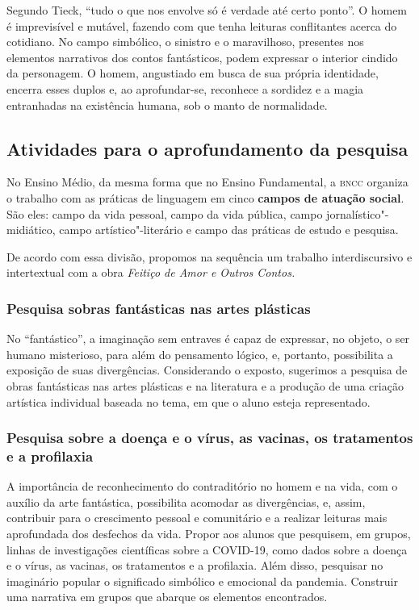 \documentclass[12pt]{extarticle}
\begin{document}
Segundo Tieck, ``tudo o que nos envolve só é verdade até certo ponto''.
O homem é imprevisível e mutável, fazendo com que tenha leituras
conflitantes acerca do cotidiano. No campo simbólico, o sinistro e o
maravilhoso, presentes nos elementos narrativos dos contos fantásticos,
podem expressar o interior cindido da personagem. O homem, angustiado em
busca de sua própria identidade, encerra esses duplos e, ao
aprofundar-se, reconhece a sordidez e a magia entranhadas na existência
humana, sob o manto de normalidade.

\subsection{Atividades para o aprofundamento da pesquisa}

No Ensino Médio, da mesma forma que no Ensino Fundamental, a \textsc{bncc}
organiza o trabalho com as práticas de linguagem em cinco \textbf{campos
de atuação social}. São eles: campo da vida pessoal, campo da vida
pública, campo jornalístico"-midiático, campo artístico"-literário e campo
das práticas de estudo e pesquisa.

De acordo com essa divisão, propomos na sequência um trabalho
interdiscursivo e intertextual com a obra \emph{Feitiço de Amor e Outros
Contos.}

\subsubsection{Pesquisa sobras fantásticas nas artes plásticas}

No ``fantástico'', a imaginação sem entraves é capaz de expressar, no
objeto, o ser humano misterioso, para além do pensamento lógico, e,
portanto, possibilita a exposição de suas divergências. Considerando o
exposto, sugerimos a pesquisa de obras fantásticas nas artes plásticas
e na literatura e a produção de uma criação artística individual
baseada no tema, em que o aluno esteja representado.

\subsubsection{Pesquisa sobre a doença
e o vírus, as vacinas, os tratamentos e a profilaxia}

A importância de reconhecimento do contraditório no homem e na vida,
com o auxílio da arte fantástica, possibilita acomodar as
divergências, e, assim, contribuir para o crescimento pessoal e
comunitário e a realizar leituras mais aprofundada dos desfechos da
vida. Propor aos alunos que pesquisem, em grupos, linhas de
investigações científicas sobre a COVID-19, como dados sobre a doença
e o vírus, as vacinas, os tratamentos e a profilaxia. Além disso,
pesquisar no imaginário popular o significado simbólico e emocional da
pandemia. Construir uma narrativa em grupos que abarque os elementos
encontrados.
\end{document}
